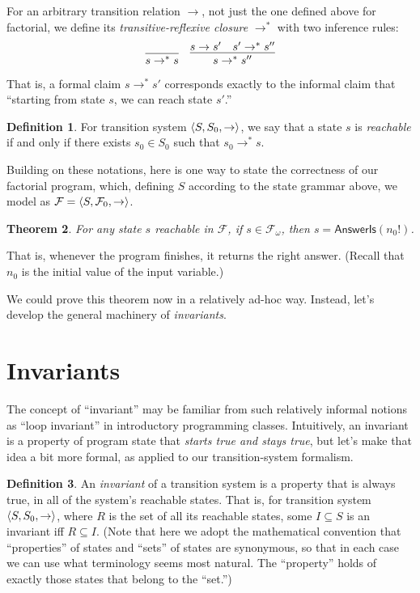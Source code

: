 \documentclass{amsbook}
\newtheorem{theorem}{Theorem}[chapter]
\theoremstyle{definition}
\newtheorem{definition}[theorem]{Definition}
\theoremstyle{remark}
\numberwithin{section}{chapter}
\numberwithin{equation}{chapter}
\begin{document}
For an arbitrary transition relation $\to$, not just the one defined above for factorial, we define its \emph{transitive-reflexive closure} $\to^*$ with two inference rules:
$$\infer{s \to^* s}{}
\quad \infer{s \to^* s''}{
  s \to s'
  & s' \to^* s''
}$$
That is, a formal claim $s \to^* s'$ corresponds exactly to the informal claim that ``starting from state $s$, we can reach state $s'$.''

\begin{definition}
  For transition system ${\left \langle S, S_0, \to \right \rangle}$, we say that a state $s$ is \emph{reachable} if and only if there exists $s_0 \in S_0$ such that $s_0 \to^* s$.
\end{definition}

Building on these notations, here is one way to state the correctness of our factorial program, which, defining $S$ according to the state grammar above, we model as $\mathcal F = {\left \langle S, \mathcal F_0, \to \right \rangle}$.

\begin{theorem}\label{factorial_ok}
  For any state $s$ reachable in $\mathcal F$, if $s \in \mathcal F_\omega$, then $s = \mathsf{AnswerIs}(n_0!)$.
\end{theorem}

That is, whenever the program finishes, it returns the right answer.
(Recall that $n_0$ is the initial value of the input variable.)

We could prove this theorem now in a relatively ad-hoc way.
Instead, let's develop the general machinery of \emph{invariants}.


\section{Invariants}

The concept of ``invariant'' may be familiar from such relatively informal notions as ``loop invariant'' in introductory programming classes.
Intuitively, an invariant is a property of program state that \emph{starts true and stays true}, but let's make that idea a bit more formal, as applied to our transition-system formalism.

\newcommand{\invariants}[0]{}

\invariants
\begin{definition}
  An \emph{invariant} of a transition system is a property that is always true, in all of the system's reachable states.  That is, for transition system ${\left \langle S, S_0, \to \right \rangle}$, where $R$ is the set of all its reachable states, some $I \subseteq S$ is an invariant iff $R \subseteq I$.  (Note that here we adopt the mathematical convention that ``properties'' of states and ``sets'' of states are synonymous, so that in each case we can use what terminology seems most natural.  The ``property'' holds of exactly those states that belong to the ``set.'')
\end{definition}
\end{document}
